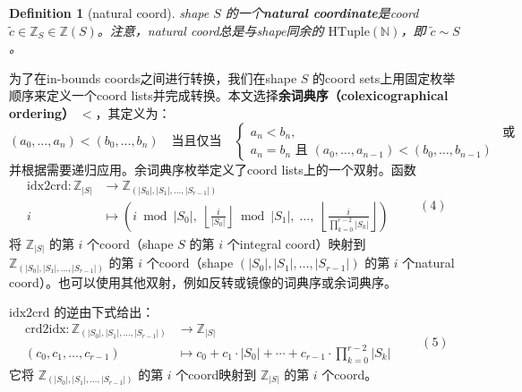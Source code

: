 \documentclass{article}
\newtheorem{definition}{Definition}[section]
\begin{document}
\begin{definition}[natural coord]
shape \(S\) 的一个\textbf{natural coordinate}是coord \(\tilde{c} \in \mathbb{Z}_{S} \in \mathbb{Z}(S)\)。注意，natural coord总是与shape同余的 \(\mathrm{HTuple}(\mathbb{N})\)，即 \(\tilde{c} \sim S\)。
\end{definition}

为了在in-bounds coords之间进行转换，我们在shape \(S\) 的coord sets上用固定枚举顺序来定义一个coord lists并完成转换。本文选择\textbf{余词典序（colexicographical ordering）} \( < \)，其定义为：
\[
(a_0, \ldots, a_n) < (b_0, \ldots, b_n) \quad \text{当且仅当} \quad 
\begin{cases}
a_n < b_n, & \text{或} \\
a_n = b_n \text{ 且 } (a_0, \ldots, a_{n-1}) < (b_0, \ldots, b_{n-1})
\end{cases}
\]
并根据需要递归应用。余词典序枚举定义了coord lists上的一个双射。函数
\[
\begin{aligned}
\mathrm{idx2crd}: \mathbb{Z}_{|S|} &\to \mathbb{Z}_{(|S_0|, |S_1|, \ldots, |S_{r-1}|)} \\
i &\mapsto \left( i \bmod |S_0|,\;
\left\lfloor \frac{i}{|S_0|} \right\rfloor \bmod |S_1|,\;
\ldots,\;
\left\lfloor \frac{i}{\prod_{k=0}^{r-2} |S_k|} \right\rfloor \right)
\end{aligned}  \qquad (4)
\]
将 \(\mathbb{Z}_{|S|}\) 的第 \(i\) 个coord（shape \(S\) 的第 \(i\) 个integral coord）映射到 \(\mathbb{Z}_{(|S_0|, |S_1|, \ldots, |S_{r-1}|)}\) 的第 \(i\) 个coord（shape \((|S_0|, |S_1|, \ldots, |S_{r-1}|)\) 的第 \(i\) 个natural coord）。也可以使用其他双射，例如反转或镜像的词典序或余词典序。

\(\mathrm{idx2crd}\) 的逆由下式给出：
\[
\begin{aligned}
\mathrm{crd2idx}: \mathbb{Z}_{(|S_0|, |S_1|, \ldots, |S_{r-1}|)} &\to \mathbb{Z}_{|S|} \\
(c_0, c_1, \ldots, c_{r-1}) &\mapsto c_0 + c_1 \cdot |S_0| + \cdots + c_{r-1} \cdot \prod_{k=0}^{r-2} |S_k|
\end{aligned}  \qquad (5)
\]
它将 \(\mathbb{Z}_{(|S_0|, |S_1|, \ldots, |S_{r-1}|)}\) 的第 \(i\) 个coord映射到 \(\mathbb{Z}_{|S|}\) 的第 \(i\) 个coord。
\end{document}

